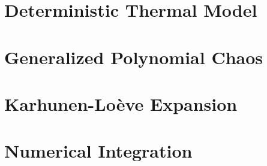 \renewcommand{\thesection}{S\arabic{section}}
\renewcommand{\thetable}{S\arabic{table}}
\renewcommand{\thefigure}{S\arabic{figure}}
\setcounter{table}{0}
\setcounter{figure}{0}

\section{Deterministic Thermal Model} 


\section{Generalized Polynomial Chaos}   


\balance

\section{Karhunen-Lo\`{e}ve Expansion} 


\section{Numerical Integration} 

